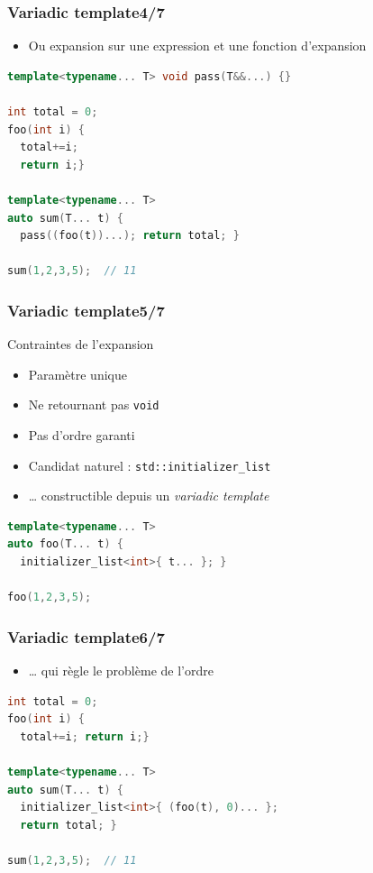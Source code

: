 \documentclass[C++.tex]{subfiles}
\begin{document}
\begin{frame}[fragile]
	\frametitle{Variadic template\titlehfill{}4/7}
	\begin{itemize}
		\item Ou expansion sur une expression et une fonction d'expansion
	\end{itemize}

	\begin{lstlisting}[language=C++]
template<typename... T> void pass(T&&...) {}

int total = 0;
foo(int i) {
  total+=i; 
  return i;}

template<typename... T>
auto sum(T... t) {
  pass((foo(t))...); return total; }

sum(1,2,3,5);  // 11\end{lstlisting}
\end{frame}

\begin{frame}[fragile]
	\frametitle{Variadic template\titlehfill{}5/7}
	\begin{alertblock}{Contraintes de l'expansion}
		\begin{itemize}
			\item Paramètre unique
			\item Ne retournant pas \lstinline|void|
			\item Pas d'ordre garanti
		\end{itemize}
	\end{alertblock}

	\begin{itemize}
		\item Candidat naturel : \lstinline|std::initializer_list|
		\item \ldots{} constructible depuis un \textit{variadic template}
	\end{itemize}

	\begin{lstlisting}[language=C++]
template<typename... T>
auto foo(T... t) {
  initializer_list<int>{ t... }; }

foo(1,2,3,5);\end{lstlisting}
\end{frame}

\begin{frame}[fragile]
	\frametitle{Variadic template\titlehfill{}6/7}
	\begin{itemize}
		\item \ldots{} qui règle le problème de l'ordre
	\end{itemize}

	\begin{lstlisting}[language=C++]
int total = 0;
foo(int i) {
  total+=i; return i;}

template<typename... T>
auto sum(T... t) {
  initializer_list<int>{ (foo(t), 0)... };
  return total; }

sum(1,2,3,5);  // 11\end{lstlisting}

\end{frame}
\end{document}
